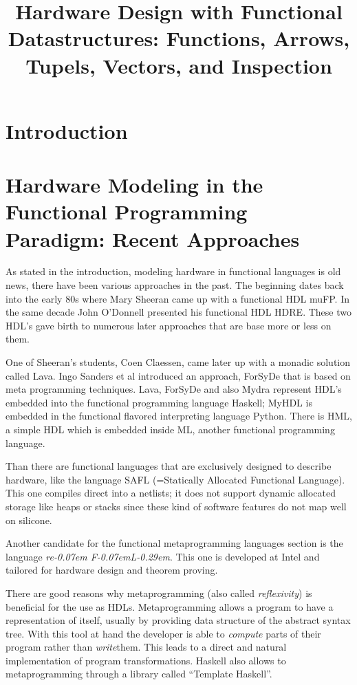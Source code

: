\documentclass[11pt,final,a4paper]{article}
\title{Hardware Design with Functional Datastructures: Functions, Arrows, Tupels, Vectors, and Inspection}
\newcommand{\reFLect}{\textit{re\kern-0.07em F\kern-0.07emL\kern-0.29em\raisebox{0.56ex}{ect}}}
\begin{document}
\section{Introduction}


\section{Hardware Modeling in the Functional Programming Paradigm: Recent Approaches}
\label{recent_approaches}
As stated in the introduction, modeling hardware in functional languages is old news, there have been various approaches in the past. The
beginning dates back into the early 80s where Mary Sheeran came up with a functional HDL muFP\cite{sheeran:muFP}. In the same decade John
O'Donnell presented his functional HDL HDRE\cite{hydra:old,donnell}. These two HDL's gave birth to numerous later approaches that are base
more or less on them. 

One of Sheeran's students, Coen Claessen, came later up with a monadic solution called Lava\cite{claessen:hardware}. Ingo Sanders et al
introduced an approach, ForSyDe \cite{forsyde:phd,forsyde:ieee} that is based on meta programming techniques. Lava, ForSyDe and also Mydra %
represent HDL's embedded into the functional programming language Haskell; MyHDL \cite{myhdl} is embedded in the functional flavored
interpreting language Python. There is HML\cite{hml}, a simple HDL which is embedded inside ML, another functional programming language. 

Than there are functional languages that are exclusively designed to describe hardware, like the language SAFL (=Statically Allocated
Functional Language)\cite{sharp,sharp:flash,sharp:codesign}. This one compiles direct into a netlists; it does not support dynamic allocated
storage like heaps or stacks since these kind of software features do not map well on silicone. 

Another candidate for the functional metaprogramming languages section is the language \reFLect \cite{reflect}. This one is developed at
Intel and tailored for hardware design and theorem proving. 

There are good reasons why metaprogramming (also called \emph{reflexivity}) is beneficial for the use as HDLs. Metaprogramming allows a
program to have a representation of itself, usually by providing data structure of the abstract syntax tree. With this tool at hand the
developer is able to \emph{compute} parts of their program rather than \emph{write}them. This leads to a direct and natural implementation
of program transformations. Haskell also allows to metaprogramming through a library called ``Template Haskell''\cite{haskell:template}. 
\end{document}
